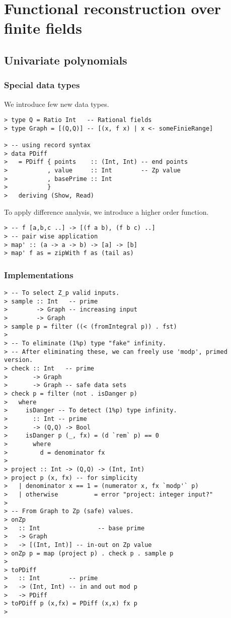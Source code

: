 \documentclass[11pt]{book}
\begin{document}
\chapter{Functional reconstruction over finite fields}
\section{Univariate polynomials}
\subsection{Special data types}
We introduce few new data types.
\begin{verbatim}
> type Q = Ratio Int   -- Rational fields
> type Graph = [(Q,Q)] -- [(x, f x) | x <- someFinieRange]

> -- using record syntax
> data PDiff 
>   = PDiff { points    :: (Int, Int) -- end points
>           , value     :: Int        -- Zp value
>           , basePrime :: Int
>           }
>   deriving (Show, Read)
\end{verbatim}

To apply difference analysis, we introduce a higher order function.
\begin{verbatim}
> -- f [a,b,c ..] -> [(f a b), (f b c) ..]
> -- pair wise application
> map' :: (a -> a -> b) -> [a] -> [b]
> map' f as = zipWith f as (tail as)
\end{verbatim}

\subsection{Implementations}
\begin{verbatim}
> -- To select Z_p valid inputs.
> sample :: Int   -- prime
>        -> Graph -- increasing input
>        -> Graph 
> sample p = filter ((< (fromIntegral p)) . fst)
>
> -- To eliminate (1%p) type "fake" infinity.
> -- After eliminating these, we can freely use 'modp', primed version.
> check :: Int   -- prime
>       -> Graph 
>       -> Graph -- safe data sets
> check p = filter (not . isDanger p)
>   where
>     isDanger -- To detect (1%p) type infinity.
>       :: Int -- prime 
>       -> (Q,Q) -> Bool
>     isDanger p (_, fx) = (d `rem` p) == 0
>       where 
>         d = denominator fx
> 
> project :: Int -> (Q,Q) -> (Int, Int)
> project p (x, fx) -- for simplicity
>   | denominator x == 1 = (numerator x, fx `modp'` p)
>   | otherwise          = error "project: integer input?"
>
> -- From Graph to Zp (safe) values.
> onZp 
>   :: Int                -- base prime
>   -> Graph
>   -> [(Int, Int)] -- in-out on Zp value 
> onZp p = map (project p) . check p . sample p
>
> toPDiff 
>   :: Int        -- prime
>   -> (Int, Int) -- in and out mod p 
>   -> PDiff
> toPDiff p (x,fx) = PDiff (x,x) fx p
>

\end{verbatim}
\end{document}
